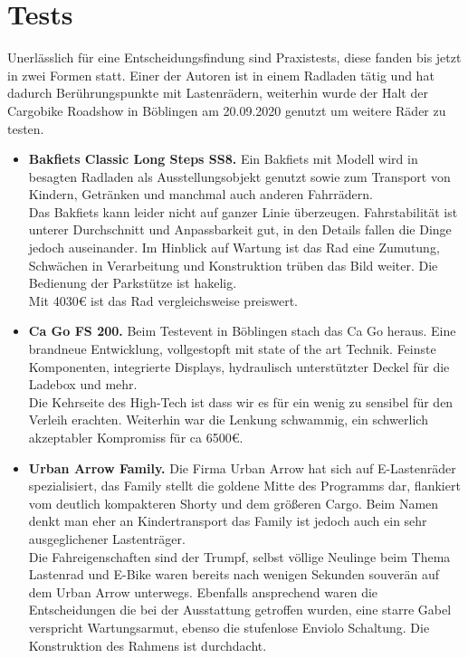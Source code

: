 \documentclass[a4paper,ngerman, 14pt] {scrartcl}
\begin{document}
\section{Tests}
Unerlässlich für eine Entscheidungsfindung sind Praxistests, diese fanden bis jetzt in zwei Formen statt. Einer der Autoren ist in einem Radladen tätig und hat dadurch Berührungspunkte mit Lastenrädern, weiterhin wurde der Halt der Cargobike Roadshow in Böblingen am 20.09.2020 genutzt um weitere Räder zu testen.
\begin{itemize}
    \item \textbf{Bakfiets Classic Long Steps SS8.} Ein Bakfiets mit Modell wird in besagten Radladen als Ausstellungsobjekt genutzt sowie zum Transport von Kindern, Getränken und manchmal auch anderen Fahrrädern.\\
    Das Bakfiets kann leider nicht auf ganzer Linie überzeugen. Fahrstabilität ist unterer Durchschnitt und Anpassbarkeit gut, in den Details fallen die Dinge jedoch auseinander. Im Hinblick auf Wartung ist das Rad eine Zumutung, Schwächen in Verarbeitung und Konstruktion trüben das Bild weiter. Die Bedienung der Parkstütze ist hakelig.\\ Mit 4030€ ist das Rad vergleichsweise preiswert.
    \item \textbf{Ca Go FS 200.} Beim Testevent in Böblingen stach das Ca Go heraus. Eine brandneue Entwicklung, vollgestopft mit state of the art Technik. Feinste Komponenten, integrierte Displays, hydraulisch unterstützter Deckel für die Ladebox und mehr.\\
    Die Kehrseite des High-Tech ist dass wir es für ein wenig zu sensibel für den Verleih erachten. Weiterhin war die Lenkung schwammig, ein schwerlich akzeptabler Kompromiss für ca 6500€.
    \item \textbf{Urban Arrow Family.} Die Firma Urban Arrow hat sich auf E-Lastenräder spezialisiert, das Family stellt die goldene Mitte des Programms dar, flankiert vom deutlich kompakteren Shorty und dem größeren Cargo. Beim Namen denkt man eher an Kindertransport das Family ist jedoch auch ein sehr ausgeglichener Lastenträger.\\
   Die Fahreigenschaften sind der Trumpf, selbst völlige Neulinge beim Thema Lastenrad und E-Bike waren bereits nach wenigen Sekunden souverän auf dem Urban Arrow unterwegs. Ebenfalls ansprechend waren die Entscheidungen die bei der Ausstattung getroffen wurden, eine starre Gabel verspricht Wartungsarmut, ebenso die stufenlose Enviolo Schaltung. Die Konstruktion des Rahmens ist durchdacht.\\

\end{itemize}
\end{document}
